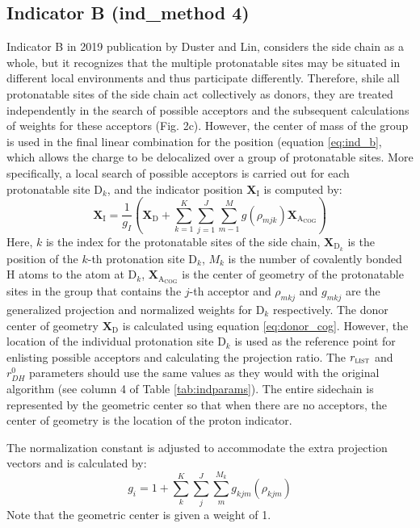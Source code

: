 \documentclass{article}
\newcommand{\mb}[1]{\mathbf{#1}}
\newcommand{\mr}[1]{\mathrm{#1}}
\begin{document}
\subsection{Indicator B (ind\_method 4)}\label{ss:ind_b}
Indicator B in 2019 publication by Duster and Lin,\cite{Duster2019} considers the side chain as a whole, but it recognizes that the multiple protonatable sites may be situated in different local environments and thus participate differently.
Therefore, shile all protonatable sites of the side chain act collectively as donors, they are treated independently in the search of possible acceptors and the subsequent calculations of weights for these acceptors (Fig. 2c).
However, the center of mass of the group is used in the final linear combination for the position (equation \ref{eq:ind_b}, which allows the charge to be delocalized over a group of protonatable sites.
More specifically, a local search of possible acceptors is carried out for each protonatable site $\mr{D}_k$, and the indicator position $\mb{X}_\mr{I}$ is computed by:
\begin{equation}\label{eq:ind_b}
\mathbf{X}_\mr{I} = \frac{1}{g_I} \left( \mathbf{X}_\mr{D} + \sum^K_{k=1} \sum^J_{j=1}   \sum^M_{m-1} g(\rho_{mjk}) \mathbf{X}_{\mr{A}_{\mr{COG}}}  \right) 
\end{equation}
Here, $k$ is the index for the protonatable sites of the side chain, $\mathbf{X}_{\mr{D}_k}$ is the position of the $k$-th protonation site $\mr{D}_k$, $M_k$ is the number of covalently bonded H atoms to the atom at $\mr{D}_k$, $\mathbf{X}_{\mr{A}_{\mr{COG}}}$ is the center of geometry of the protonatable sites in the group that contains the $j$-th acceptor  and $\rho_{mkj}$ and $g_{mkj}$ are the generalized projection and normalized weights for $\mr{D}_k$ respectively. 
The donor center of geometry $\mathbf{X}_\mr{D}$ is calculated using equation \ref{eq:donor_cog}.
However, the location of the individual protonation site $\mr{D}_k$ is used as the reference point for enlisting possible acceptors and calculating the projection ratio.
The $r_\mathrm{\textsc{list}}$ and $r^0_{DH}$ parameters should use the same values as they would with the original algorithm (see column 4 of Table \ref{tab:indparams}).
The entire sidechain is represented by the geometric center so that when there are no acceptors, the center of geometry is the location of the proton indicator.

The normalization constant is adjusted to accommodate the extra projection vectors and is calculated by:
\begin{equation}\label{eq:ind_b-normalization}
g_i = 1 + \sum_k^K \sum_j^J \sum_m^{M_k} g_{kjm}(\rho_{kjm})
\end{equation}
Note that the geometric center is given a weight of 1.
\end{document}
